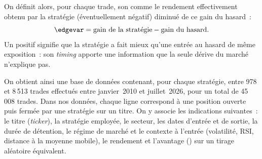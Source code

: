 On définit alors, pour chaque trade, son \edgevar{} comme le rendement
effectivement obtenu par la stratégie (éventuellement négatif) diminué de
ce gain du hasard~:
\[
  \edgevar = \text{gain de la stratégie} - \text{gain du hasard}.
\]
Un \edgevar{} positif signifie que la stratégie a fait mieux qu'une entrée
au hasard de même exposition~: son \emph{timing} apporte une information
que la seule dérive du marché n'explique pas.

On obtient ainsi une base de données contenant, pour chaque stratégie,
entre 978 et 8\,513 trades effectués entre janvier~2010 et juillet~2026,
pour un total de 45\,008 trades.
Dans nos données, chaque ligne correspond à une position ouverte puis fermée par une
stratégie sur un titre.
On y associe les indications suivantes~: le titre
(\emph{ticker}), la stratégie employée, le secteur, les dates d'entrée et de
sortie, la durée de détention, le régime de marché et le contexte à l'entrée
(volatilité, RSI, distance à la moyenne mobile), le rendement et l'avantage
(\edgevar{}) sur un tirage aléatoire équivalent.

